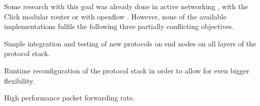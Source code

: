 \documentclass{sig-alternate}
\begin{document}
Some research with this goal was already done in active networking \cite{ANSurvey2}, with the Click modular router \cite{click} or with openflow \cite{openflow}. However, none of the available implementations fulfils the following three partially conflicting objectives. 
\begin{compactenum}
\item Simple integration and testing of new protocols on end nodes on all layers of the protocol stack.
\item Runtime reconfiguration of the protocol stack in order to allow for even bigger flexibility.
\item High performance packet forwarding rate.
\end{compactenum}
\end{document}
